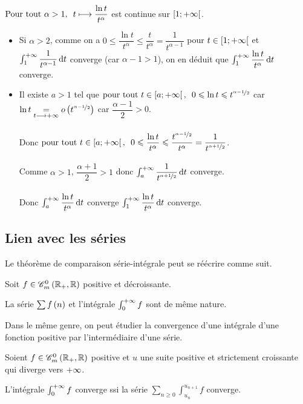 \begin{corr}
\(\quantifs{\Tpt\alpha>1}t\mapsto\dfrac{\ln t}{t^\alpha}\) est continue sur \(\left[1;+\infty\right[\).

\begin{itemize}
    \item Si \(\alpha>2\), comme on a \(0\leq\dfrac{\ln t}{t^\alpha}\leq\dfrac{t}{t^\alpha}=\dfrac{1}{t^{\alpha-1}}\) pour \(t\in\left[1;+\infty\right[\) et \(\int_1^{\pinf}\dfrac{1}{t^{\alpha-1}}\odif{t}\) converge (car \(\alpha-1>1\)), on en déduit que \(\int_1^{\pinf}\dfrac{\ln t}{t^\alpha}\odif{t}\) converge. \\
    \item Il existe \(a>1\) tel que \(\quantifs{\tpt t\in\intervie{a}{\pinf}}0\leq\ln t\leq t^{\nicefrac{\alpha-1}{2}}\) car \(\ln t\underset{t\longrightarrow+\infty}{=}o\left(t^{\nicefrac{\alpha-1}{2}}\right)\) car \(\dfrac{\alpha-1}{2}>0\). \\\\ Donc \(\quantifs{\tpt t\in\intervie{a}{\pinf}}0\leq\dfrac{\ln t}{t^\alpha}\leq\dfrac{t^{\nicefrac{\alpha-1}{2}}}{t^\alpha}=\dfrac{1}{t^{\nicefrac{\alpha+1}{2}}}\). \\\\ Comme \(\alpha>1\), \(\dfrac{\alpha+1}{2}>1\) donc \(\int_a^{\pinf}\dfrac{1}{t^{\nicefrac{\alpha+1}{2}}}\odif{t}\) converge. \\\\ Donc \(\int_a^{\pinf}\dfrac{\ln t}{t^\alpha}\odif{t}\) converge \ie \(\int_1^{\pinf}\dfrac{\ln t}{t^\alpha}\odif{t}\) converge.
\end{itemize}
\end{corr}

\subsection{Lien avec les séries}

Le théorème de comparaison série-intégrale peut se réécrire comme suit.

\begin{prop}
Soit \(f\in\contm[\Rp][\R]\) positive et décroissante.

La série \(\sum f\left(n\right)\) et l'intégrale \(\int_0^{+\infty}f\) sont de même nature.
\end{prop}

Dans le même genre, on peut étudier la convergence d'une intégrale d'une fonction positive par l'intermédiaire d'une série.

\begin{prop}
Soient \(f\in\contm[\Rp][\R]\) positive et \(u\) une suite positive et strictement croissante qui diverge vers \(+\infty\).

L'intégrale \(\int_0^{+\infty}f\) converge ssi la série \(\sum_{n\geq0}\int_{u_n}^{u_{n+1}}f\) converge.
\end{prop}


